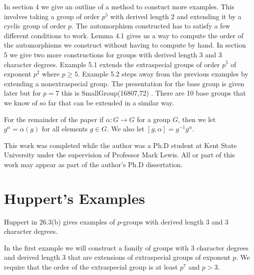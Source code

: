 \documentclass[]{amsart}
\theoremstyle{definition}
\theoremstyle{definition}
\theoremstyle{definition}
\theoremstyle{definition}
\theoremstyle{remark}
\theoremstyle{remark}
\begin{document}
          In section 4 we give an outline of a method to constuct more examples. This involves taking a group of order $p^5$ with derived length 2 and extending it by a cyclic group of order $p$. The automorphism constructed has to satisfy a few different conditions to work. Lemma 4.1 gives us a way to compute the order of the automorphisms we construct without having to compute by hand. In section 5 we give two more constructions for groups with derived length 3 and 3 character degrees. Example 5.1 extends the extraspecial groups of order $p^5$ of exponent $p^2$ where $p\geq 5$. Example 5.2 steps away from the previous examples by extending a nonextraspecial group. The presentation for the base group is given later but for $p=7$ this is SmallGroup(16807,72) \cite{Smallgrp}. There are 10 base groups that we know of so far that can be extended in a similar way. 
          
          For the remainder of the paper if $\alpha :G\to G$ for a group $G$, then we let $g^{\alpha}=\alpha(g)$ for all elements $g\in G$. We also let $[g,\alpha]=g^{-1}g^{\alpha}$.

          This work was completed while the author was a Ph.D student at Kent State University under the supervision of Professor Mark Lewis. All or part of this work may appear as part of the author's Ph.D dissertation.


    \section{Huppert's Examples}

        Huppert in \cite{Hup} 26.3(b) gives examples of $p$-groups with derived length 3 and 3 character degrees. 

        In the first example we will construct a family of groups with 3 character degrees and derived length 3 that are extensions of extraspecial groups of exponent $p$. We require that the order of the extraspecial group is at least $p^{7}$ and $p>3$.
        
\end{document}
